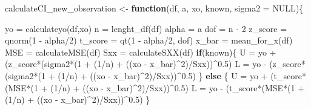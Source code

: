 \documentclass[
]{article}
\newenvironment{Shaded}{\begin{snugshade}}{\end{snugshade}}
\newcommand{\AttributeTok}[1]{\textcolor[rgb]{0.77,0.63,0.00}{#1}}
\newcommand{\ConstantTok}[1]{\textcolor[rgb]{0.00,0.00,0.00}{#1}}
\newcommand{\ControlFlowTok}[1]{\textcolor[rgb]{0.13,0.29,0.53}{\textbf{#1}}}
\newcommand{\DecValTok}[1]{\textcolor[rgb]{0.00,0.00,0.81}{#1}}
\newcommand{\FloatTok}[1]{\textcolor[rgb]{0.00,0.00,0.81}{#1}}
\newcommand{\FunctionTok}[1]{\textcolor[rgb]{0.00,0.00,0.00}{#1}}
\newcommand{\NormalTok}[1]{#1}
\newcommand{\OtherTok}[1]{\textcolor[rgb]{0.56,0.35,0.01}{#1}}
\newcommand{\SpecialCharTok}[1]{\textcolor[rgb]{0.00,0.00,0.00}{#1}}
\begin{document}
\begin{Shaded}
\begin{Highlighting}[]
\NormalTok{calculateCI\_new\_observation }\OtherTok{\textless{}{-}} \ControlFlowTok{function}\NormalTok{(df, a, xo, known, }\AttributeTok{sigma2 =} \ConstantTok{NULL}\NormalTok{)\{}
  
\NormalTok{  yo }\OtherTok{=} \FunctionTok{calculateyo}\NormalTok{(df,xo)}
\NormalTok{  n }\OtherTok{=} \FunctionTok{lenght\_df}\NormalTok{(df)}
\NormalTok{  alpha }\OtherTok{=}\NormalTok{ a}
\NormalTok{  dof }\OtherTok{=}\NormalTok{ n }\SpecialCharTok{{-}} \DecValTok{2}
\NormalTok{  z\_score }\OtherTok{=} \FunctionTok{qnorm}\NormalTok{(}\DecValTok{1} \SpecialCharTok{{-}}\NormalTok{ alpha}\SpecialCharTok{/}\DecValTok{2}\NormalTok{)}
\NormalTok{  t\_score }\OtherTok{=} \FunctionTok{qt}\NormalTok{(}\DecValTok{1} \SpecialCharTok{{-}}\NormalTok{ alpha}\SpecialCharTok{/}\DecValTok{2}\NormalTok{, dof)}
\NormalTok{  x\_bar }\OtherTok{=} \FunctionTok{mean\_for\_x}\NormalTok{(df)}
\NormalTok{  MSE }\OtherTok{=} \FunctionTok{calculateMSE}\NormalTok{(df)}
\NormalTok{  Sxx }\OtherTok{=} \FunctionTok{calculateSXX}\NormalTok{(df)}
  \ControlFlowTok{if}\NormalTok{(known)\{}
\NormalTok{    U }\OtherTok{=}\NormalTok{ yo }\SpecialCharTok{+}\NormalTok{ (z\_score}\SpecialCharTok{*}\NormalTok{(sigma2}\SpecialCharTok{*}\NormalTok{(}\DecValTok{1} \SpecialCharTok{+}\NormalTok{ (}\DecValTok{1}\SpecialCharTok{/}\NormalTok{n) }\SpecialCharTok{+}\NormalTok{ ((xo }\SpecialCharTok{{-}}\NormalTok{ x\_bar)}\SpecialCharTok{\^{}}\DecValTok{2}\NormalTok{)}\SpecialCharTok{/}\NormalTok{Sxx))}\SpecialCharTok{\^{}}\FloatTok{0.5}\NormalTok{)}
\NormalTok{    L }\OtherTok{=}\NormalTok{ yo }\SpecialCharTok{{-}}\NormalTok{ (z\_score}\SpecialCharTok{*}\NormalTok{(sigma2}\SpecialCharTok{*}\NormalTok{(}\DecValTok{1} \SpecialCharTok{+}\NormalTok{ (}\DecValTok{1}\SpecialCharTok{/}\NormalTok{n) }\SpecialCharTok{+}\NormalTok{ ((xo }\SpecialCharTok{{-}}\NormalTok{ x\_bar)}\SpecialCharTok{\^{}}\DecValTok{2}\NormalTok{)}\SpecialCharTok{/}\NormalTok{Sxx))}\SpecialCharTok{\^{}}\FloatTok{0.5}\NormalTok{)}
\NormalTok{  \} }\ControlFlowTok{else}\NormalTok{ \{}
\NormalTok{    U }\OtherTok{=}\NormalTok{ yo }\SpecialCharTok{+}\NormalTok{ (t\_score}\SpecialCharTok{*}\NormalTok{(MSE}\SpecialCharTok{*}\NormalTok{(}\DecValTok{1} \SpecialCharTok{+}\NormalTok{ (}\DecValTok{1}\SpecialCharTok{/}\NormalTok{n) }\SpecialCharTok{+}\NormalTok{ ((xo }\SpecialCharTok{{-}}\NormalTok{ x\_bar)}\SpecialCharTok{\^{}}\DecValTok{2}\NormalTok{)}\SpecialCharTok{/}\NormalTok{Sxx))}\SpecialCharTok{\^{}}\FloatTok{0.5}\NormalTok{)}
\NormalTok{    L }\OtherTok{=}\NormalTok{ yo }\SpecialCharTok{{-}}\NormalTok{ (t\_score}\SpecialCharTok{*}\NormalTok{(MSE}\SpecialCharTok{*}\NormalTok{(}\DecValTok{1} \SpecialCharTok{+}\NormalTok{ (}\DecValTok{1}\SpecialCharTok{/}\NormalTok{n) }\SpecialCharTok{+}\NormalTok{ ((xo }\SpecialCharTok{{-}}\NormalTok{ x\_bar)}\SpecialCharTok{\^{}}\DecValTok{2}\NormalTok{)}\SpecialCharTok{/}\NormalTok{Sxx))}\SpecialCharTok{\^{}}\FloatTok{0.5}\NormalTok{)}
\NormalTok{  \}}
  

\end{Highlighting}
\end{Shaded}
\end{document}
